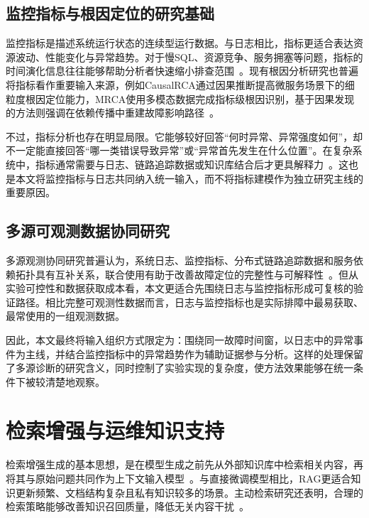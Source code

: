 \subsection{监控指标与根因定位的研究基础}

监控指标是描述系统运行状态的连续型运行数据。与日志相比，指标更适合表达资源波动、性能变化与异常趋势。对于慢SQL、资源竞争、服务拥塞等问题，指标的时间演化信息往往能够帮助分析者快速缩小排查范围~\cite{ma2020slowquery,pham2024rcacausal}。现有根因分析研究也普遍将指标看作重要输入来源，例如CausalRCA通过因果推断提高微服务场景下的细粒度根因定位能力，MRCA使用多模态数据完成指标级根因识别，基于因果发现的方法则强调在依赖传播中重建故障影响路径~\cite{xin2023causalrca,wang2024mrca,ikram2022causaldiscovery}。

不过，指标分析也存在明显局限。它能够较好回答“何时异常、异常强度如何”，却不一定能直接回答“哪一类错误导致异常”或“异常首先发生在什么位置”。在复杂系统中，指标通常需要与日志、链路追踪数据或知识库结合后才更具解释力~\cite{soldani2023survey,cheng2023rcasurvey}。这也是本文将监控指标与日志共同纳入统一输入，而不将指标建模作为独立研究主线的重要原因。

\subsection{多源可观测数据协同研究}

多源观测协同研究普遍认为，系统日志、监控指标、分布式链路追踪数据和服务依赖拓扑具有互补关系，联合使用有助于改善故障定位的完整性与可解释性~\cite{soldani2023survey,zhang2024fdsurvey}。但从实验可控性和数据获取成本看，本文更适合先围绕日志与监控指标形成可复核的验证路径。相比完整可观测性数据而言，日志与监控指标也是实际排障中最易获取、最常使用的一组观测数据。

因此，本文最终将输入组织方式限定为：围绕同一故障时间窗，以日志中的异常事件为主线，并结合监控指标中的异常趋势作为辅助证据参与分析。这样的处理保留了多源诊断的研究含义，同时控制了实验实现的复杂度，使方法效果能够在统一条件下被较清楚地观察。

\section{检索增强与运维知识支持}

检索增强生成的基本思想，是在模型生成之前先从外部知识库中检索相关内容，再将其与原始问题共同作为上下文输入模型~\cite{gao2023ragsurvey}。与直接微调模型相比，RAG更适合知识更新频繁、文档结构复杂且私有知识较多的场景。主动检索研究还表明，合理的检索策略能够改善知识召回质量，降低无关内容干扰~\cite{jiang2023active}。

